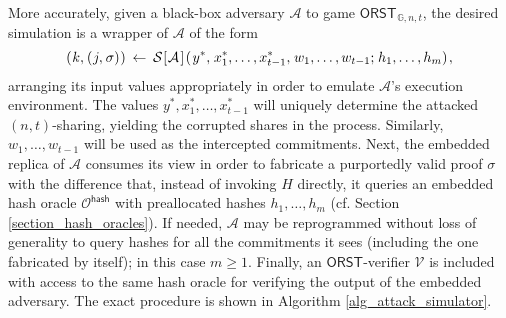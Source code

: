 \documentclass[10pt, psamsfonts, reqno]{amsart}
\theoremstyle{definition}
\theoremstyle{remark}
\numberwithin{equation}{section}
\begin{document}
More accurately, given a black-box adversary $\mathcal{A}$
to game $\mathsf{ORST}_{\hspace{1pt}\mathbb{G}, n, t}$,
the desired simulation is a wrapper of $\mathcal{A}$ of the form
\vspace{5pt}
\begin{equation*}
	(
		\hspace{0.5pt}
		k,
		\hspace{0.5pt}
		(
			\hspace{0.5pt}
			j,
			\hspace{0.5pt}
			\sigma
		)
		\hspace{0.5pt}
	)
	\hspace{2pt}
	\leftarrow
	\hspace{2pt}
	\mathcal{S}
		\hspace{.5pt}
		[
			\hspace{0.5pt}
			\mathcal{A}
			\hspace{1pt}
		]
		\hspace{1pt}
		(
			\hspace{1pt}
			y ^*,
			\hspace{1pt}
			x_1^*, \dots, x_{t-1}^*,
			\hspace{1pt}
			w_1, \dots, w_{t-1};
			\hspace{1pt}
			h_1, \dots, h_m
		)\hspace{1pt},
\vspace{5pt}
\end{equation*}
arranging its input values appropriately
in order to emulate $\mathcal{A}$'s execution environment.
The values $y^*, x_1^*, \dots, x_{t-1}^*$
will uniquely determine the attacked $(n, t)$-sharing,
yielding the corrupted shares in the process.
Similarly, $w_1, \dots, w_{t-1}$ will be used
as the intercepted commitments.
Next, the embedded replica of $\mathcal{A}$
consumes its view in order to fabricate
a purportedly valid proof $\sigma$
with the difference that,
instead of invoking $H$ directly,
it queries an embedded hash oracle
$\mathcal{O}^{\mathsf{hash}}$
with preallocated hashes $h_1, \dots, h_{m}$
(cf. Section \ref{section_hash_oracles}).
If needed, $\mathcal{A}$ may be reprogrammed
without loss of generality
to query hashes for all the commitments it sees
(including the one fabricated by itself);
in this case $m \ge 1$.
Finally, an $\mathsf{ORST}$-verifier $\mathcal{V}$
is included with access to the same hash oracle for
verifying the output of the embedded adversary.
The exact procedure is shown in Algorithm \ref{alg_attack_simulator}.
\end{document}
